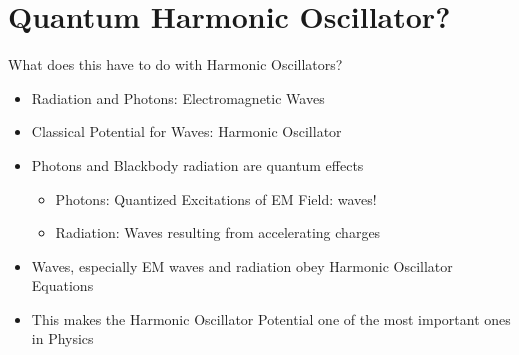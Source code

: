 \documentclass{beamer}
\begin{document}
\section{Quantum Harmonic Oscillator?}
\begin{frame}{What does this have to do with Harmonic Oscillators?}
  \begin{itemize}
  \item Radiation and Photons: Electromagnetic Waves
  \item Classical Potential for Waves: Harmonic Oscillator
  \item Photons and Blackbody radiation are quantum effects
    \begin{itemize}
    \item Photons: Quantized Excitations of EM Field: waves!
    \item Radiation: Waves resulting from accelerating charges
    \end{itemize}
  \item Waves, especially EM waves and radiation obey Harmonic Oscillator Equations
  \item This makes the Harmonic Oscillator Potential one of the most important ones in Physics
  \end{itemize}
\end{frame}
\end{document}
